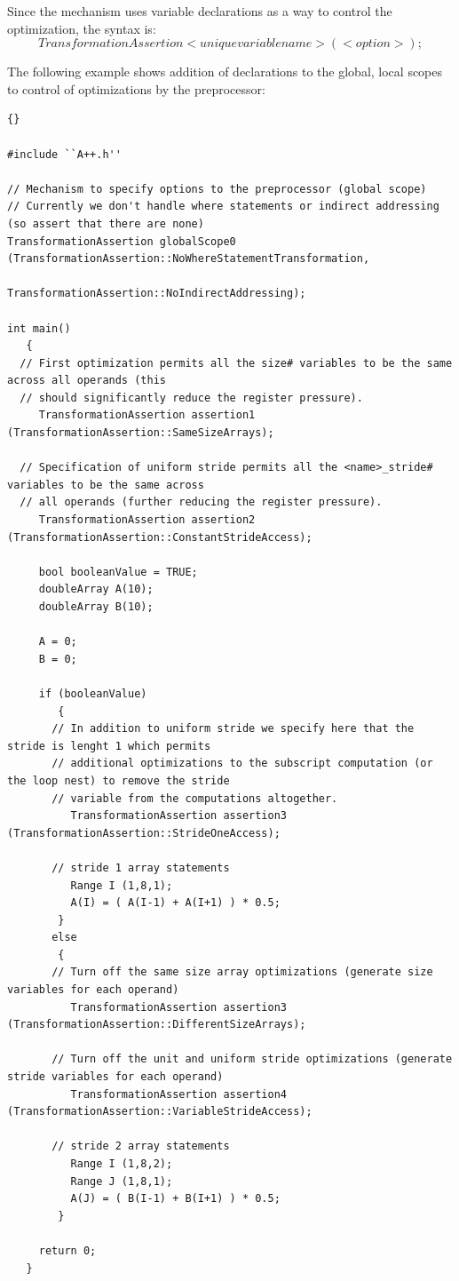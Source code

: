 \documentclass[10pt]{article}
\begin{document}
   Since the mechanism uses variable declarations as a way to control the optimization, the syntax is:
   $$ TransformationAssertion <unique variable name> (<option>); $$

   The following example shows addition of declarations to the global, local scopes to control of
optimizations by the preprocessor:

\vspace{0.5in}

\begin{lstlisting}{}

#include ``A++.h''

// Mechanism to specify options to the preprocessor (global scope)
// Currently we don't handle where statements or indirect addressing (so assert that there are none)
TransformationAssertion globalScope0 (TransformationAssertion::NoWhereStatementTransformation,
                                      TransformationAssertion::NoIndirectAddressing);

int main()
   {
  // First optimization permits all the size# variables to be the same across all operands (this
  // should significantly reduce the register pressure).
     TransformationAssertion assertion1 (TransformationAssertion::SameSizeArrays);

  // Specification of uniform stride permits all the <name>_stride# variables to be the same across
  // all operands (further reducing the register pressure).
     TransformationAssertion assertion2 (TransformationAssertion::ConstantStrideAccess);

     bool booleanValue = TRUE;
     doubleArray A(10);
     doubleArray B(10);

     A = 0;
     B = 0;

     if (booleanValue)
        {
       // In addition to uniform stride we specify here that the stride is lenght 1 which permits
       // additional optimizations to the subscript computation (or the loop nest) to remove the stride
       // variable from the computations altogether.
          TransformationAssertion assertion3 (TransformationAssertion::StrideOneAccess);

       // stride 1 array statements
          Range I (1,8,1);
          A(I) = ( A(I-1) + A(I+1) ) * 0.5;
        }
       else
        {
       // Turn off the same size array optimizations (generate size variables for each operand)
          TransformationAssertion assertion3 (TransformationAssertion::DifferentSizeArrays);

       // Turn off the unit and uniform stride optimizations (generate stride variables for each operand)
          TransformationAssertion assertion4 (TransformationAssertion::VariableStrideAccess);

       // stride 2 array statements
          Range I (1,8,2);
          Range J (1,8,1);
          A(J) = ( B(I-1) + B(I+1) ) * 0.5;
        }

     return 0;
   }

\end{lstlisting}
\end{document}
